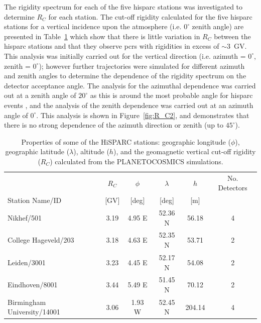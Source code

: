 The rigidity spectrum for each of the five \gls{hisparc} stations was investigated to determine $R_C$ for each station. The cut-off rigidity calculated for the five \gls{hisparc} stations for a vertical incidence upon the atmosphere (i.e. $0^\circ$ zenith angle) are presented in Table~\ref{tab:HS_stns} which show that there is little variation in $R_C$ between the \gls{hisparc} stations and that they observe \glspl{pcr} with rigidities in excess of $\sim 3$~GV. This analysis was initially carried out for the vertical direction (i.e. azimuth = $0^\circ$, zenith = $0^\circ$); however further trajectories were simulated for different azimuth and zenith angles to determine the dependence of the rigidity spectrum on the detector acceptance angle. The analysis for the azimuthal dependence was carried out at a zenith angle of $20^\circ$ as this is around the most probable angle for \gls{hisparc} events \citep{fokkema_hisparc_2012}, and the analysis of the zenith dependence was carried out at an azimuth angle of $0^\circ$. This analysis is shown in Figure~\ref{fig:R_C2}, and demonstrates that there is no strong dependence of the azimuth direction or zenith (up to $45^{\circ}$).


\begin{table}
	\begin{center}
		\caption{Properties of some of the HiSPARC stations: geographic longitude ($\phi$), geographic latitude ($\lambda$), altitude ($h$), and the geomagnetic vertical cut-off rigidity ($R_C$) calculated from the PLANETOCOSMICS simulations.}
		\label{tab:HS_stns}
		\begin{tabular}{l c c c c c}
			\hline
			& $R_C$  & $\phi$ & $\lambda$  & $h$  & No. Detectors\\
			Station Name/ID & [GV] & [deg] & [deg] & [m]  & \\
			\hline
			Nikhef/501 & 3.19 & 4.95 E & 52.36 N & 56.18 & 4 \\
			College Hageveld/203 & 3.18 & 4.63 E  & 52.35 N & 53.71  & 2 \\
			Leiden/3001 & 3.23 & 4.45 E & 52.17 N & 54.08 & 2 \\
			Eindhoven/8001  & 3.44 & 5.49 E & 51.45 N & 70.12 & 2 \\
			Birmingham University/14001  & 3.06 & 1.93 W & 52.45 N & 204.14 & 4  \\
			\hline
		\end{tabular}
	\end{center}
\end{table}


